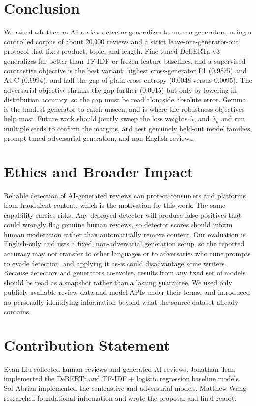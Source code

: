 \documentclass[manuscript,nonacm]{acmart}
\begin{document}
\section{Conclusion}

We asked whether an AI-review detector generalizes to unseen generators, using a
controlled corpus of about 20{,}000 reviews and a strict leave-one-generator-out
protocol that fixes product, topic, and length. Fine-tuned DeBERTa-v3 generalizes
far better than TF-IDF or frozen-feature baselines, and a supervised contrastive
objective is the best variant: highest cross-generator F1 (0.9875) and AUC
(0.9994), and half the gap of plain cross-entropy (0.0048 versus 0.0095). The
adversarial objective shrinks the gap further (0.0015) but only by lowering
in-distribution accuracy, so the gap must be read alongside absolute error. Gemma
is the hardest generator to catch unseen, and is where the robustness objectives
help most. Future work should jointly sweep the loss weights $\lambda_c$ and
$\lambda_a$ and run multiple seeds to confirm the margins, and test genuinely
held-out model families, prompt-tuned adversarial generation, and non-English
reviews.

\section*{Ethics and Broader Impact}
Reliable detection of AI-generated reviews can protect consumers and platforms
from fraudulent content, which is the motivation for this work. The same
capability carries risks. Any deployed detector will produce false positives that
could wrongly flag genuine human reviews, so detector scores should inform human
moderation rather than automatically remove content. Our evaluation is
English-only and uses a fixed, non-adversarial generation setup, so the reported
accuracy may not transfer to other languages or to adversaries who tune prompts
to evade detection, and applying it as-is could disadvantage some writers.
Because detectors and generators co-evolve, results from any fixed set of models
should be read as a snapshot rather than a lasting guarantee. We used only
publicly available review data and model APIs under their terms, and introduced
no personally identifying information beyond what the source dataset already
contains.

\section*{Contribution Statement}
Evan Liu collected human reviews and generated AI reviews. Jonathan Tran
implemented the DeBERTa and TF-IDF + logistic regression baseline models. Sol
Abrian implemented the contrastive and adversarial models. Matthew Wang
researched foundational information and wrote the proposal and final report.
\end{document}
